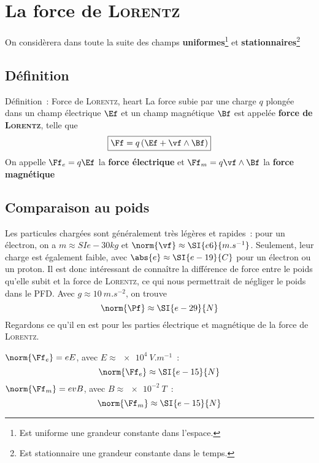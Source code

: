 \documentclass[../main/main.tex]{subfiles}
\begin{document}
\vspace{-12pt}
\section{La force de \textsc{Lorentz}}
On considèrera dans toute la suite des champs \textbf{uniformes}\footnote{Est
uniforme une grandeur constante dans l'espace.} et
\textbf{stationnaires}\footnote{Est stationnaire une grandeur constante dans le
temps.}
\vspace{-12pt}

\subsection{Définition}
\begin{tdefi}{Définition~: Force de \textsc{Lorentz}, heart}
    La force subie par une charge $q$ plongée dans un champ électrique $\Ef$ et
    un champ magnétique $\Bf$ est appelée \textbf{force de \textsc{Lorentz}},
    telle que
    \[\boxed{\Ff = q\left(\Ef + \vf \wedge \Bf\right)}\]
    On appelle $\Ff_e = q\Ef$ la \textbf{force électrique} et $\Ff_m =
    q\vf\wedge\Bf$ la \textbf{force magnétique}
\end{tdefi}

\subsection{Comparaison au poids}

Les particules chargées sont généralement très légères et rapides~: pour un
électron, on a $m \approx SI{e-30}{kg}$ et $\norm{\vf} \approx
\SI{e6}{m.s^{-1}}$. Seulement, leur charge est également faible, avec $\abs{e}
\approx \SI{e-19}{C}$ pour un électron ou un proton. Il est donc intéressant de
connaître la différence de force entre le poids qu'elle subit et la force de
\textsc{Lorentz}, ce qui nous permettrait de négliger le poids dans le PFD.
Avec $g \approx \SI{10}{m.s^{-2}}$, on trouve
\[\norm{\Pf} \approx \SI{e-29}{N}\]
Regardons ce qu'il en est pour les parties électrique et magnétique de la force
de \textsc{Lorentz}.
\bigbreak

\begin{itemize}[label=$\diamond$]
     $\norm{\Ff_e} = eE$, avec $E \approx
        \SI{e4}{V.m^{-1}}$~:
        \[\norm{\Ff_e} \approx \SI{e-15}{N}\]
     $\norm{\Ff_m} = evB$, avec $B \approx
        \SI{e-2}{T}$~:
        \[\norm{\Ff_m} \approx \SI{e-15}{N}\]
\end{itemize}
\end{document}
